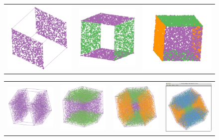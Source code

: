 \begin{itemize}
  \begin{figure}[ht]
    \centering
    \begin{tabular}{c c c}
      \includegraphics[width=.9in]{fig/cube-x.pdf} &
      \includegraphics[width=.9in]{fig/cube-x-y.pdf} &
      \includegraphics[width=.9in]{fig/cube-x-y-z.pdf}
    \end{tabular}
  \begin{tabular}{cccc}
    \includegraphics[width=1in]{fig/cube-4-face-1-1.pdf} & \includegraphics[width=1in]{fig/cube-4-face-2-1.pdf} &
    \includegraphics[width=1in]{fig/cube-4-face-3-1.pdf} &\includegraphics[width=1in]{fig/cube-4-face-4-1.pdf}
  \end{tabular}


\end{figure}
\end{itemize}
